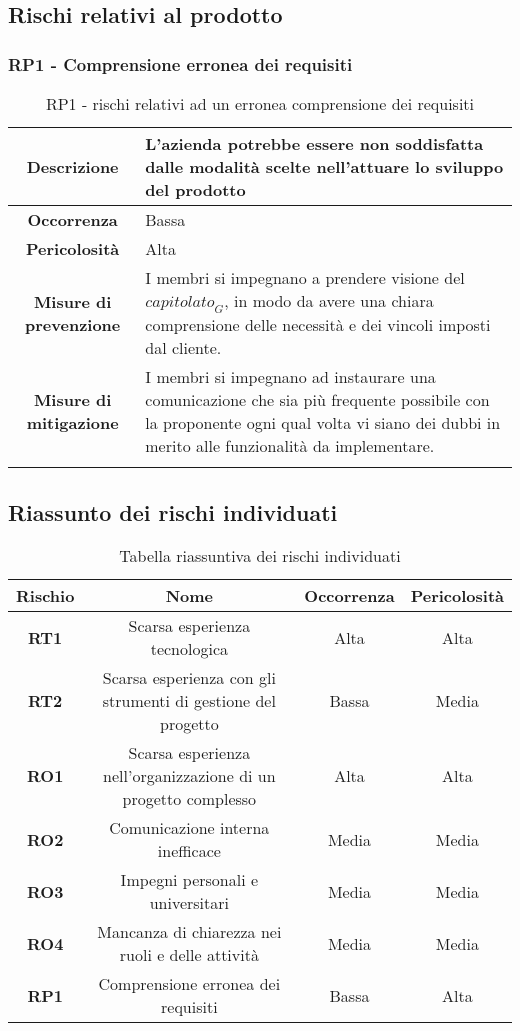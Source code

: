 \subsection{Rischi relativi al prodotto}
%
%
\subsubsection[RP1]{RP1 - Comprensione erronea dei requisiti}\label{rp:1}
\begin{longtable}{|c|p{12cm}|}
\hline
\textbf{Descrizione} & L'azienda potrebbe essere non soddisfatta dalle modalità scelte nell'attuare lo sviluppo del prodotto\\
\hline
\textbf{Occorrenza} & Bassa \\
\hline
\textbf{Pericolosità} & Alta \\
\hline
\textbf{Misure di prevenzione} & I membri si impegnano a prendere visione del $\textit{capitolato}_G$, in modo da avere una chiara comprensione delle necessità e dei vincoli imposti dal cliente. \\
\hline
\textbf{Misure di mitigazione} &  I membri si impegnano ad instaurare una comunicazione che sia più frequente possibile con la proponente ogni qual volta vi siano dei dubbi in merito alle funzionalità da implementare.\\
\hline
\caption{RP1 - rischi relativi ad un erronea comprensione dei requisiti}
\end{longtable}

\subsection{Riassunto dei rischi individuati}
\begin{table}[h]
\centering
\begin{tabular}{|c|c|c|c|}
\hline
\textbf{Rischio} & \textbf{Nome} & \textbf{Occorrenza} & \textbf{Pericolosità} \\
\hline
\textbf{RT1} & Scarsa esperienza tecnologica & Alta & Alta \\
\hline
\textbf{RT2} & Scarsa esperienza con gli strumenti di gestione del progetto & Bassa & Media \\
\hline
\textbf{RO1} & Scarsa esperienza nell’organizzazione di un progetto complesso & Alta & Alta \\
\hline
\textbf{RO2} & Comunicazione interna inefficace & Media & Media \\
\hline
\textbf{RO3} & Impegni personali e universitari & Media & Media \\
\hline
\textbf{RO4} & Mancanza di chiarezza nei ruoli e delle attività & Media & Media \\
\hline
\textbf{RP1} & Comprensione erronea dei requisiti & Bassa & Alta \\
\hline
\end{tabular}
\caption{Tabella riassuntiva dei rischi individuati}
\label{tab:rischi}
\end{table}